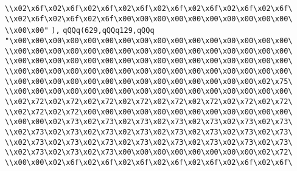 \verb|\\x02\x6f\x02\x6f\x02\x6f\x02\x6f\x02\x6f\x02\x6f\x02\x6f\x02\x6f\|\newline
\verb|\\x02\x6f\x02\x6f\x02\x6f\x00\x00\x00\x00\x00\x00\x00\x00\x00\x00\|\newline
\verb|\\x00\x00"|\newline
\verb|),|\newline
\verb|qQQq(629,qQQq129,qQQq|\newline
\verb|"\x00\x00\x00\x00\x00\x00\x00\x00\x00\x00\x00\x00\x00\x00\x00\x00\|\newline
\verb|\\x00\x00\x00\x00\x00\x00\x00\x00\x00\x00\x00\x00\x00\x00\x00\x00\|\newline
\verb|\\x00\x00\x00\x00\x00\x00\x00\x00\x00\x00\x00\x00\x00\x00\x00\x00\|\newline
\verb|\\x00\x00\x00\x00\x00\x00\x00\x00\x00\x00\x00\x00\x00\x00\x00\x00\|\newline
\verb|\\x00\x00\x00\x00\x00\x00\x00\x00\x00\x00\x00\x00\x00\x00\x02\x75\|\newline
\verb|\\x00\x00\x00\x00\x00\x00\x00\x00\x00\x00\x00\x00\x00\x00\x00\x00\|\newline
\verb|\\x02\x72\x02\x72\x02\x72\x02\x72\x02\x72\x02\x72\x02\x72\x02\x72\|\newline
\verb|\\x02\x72\x02\x72\x00\x00\x00\x00\x00\x00\x00\x00\x00\x00\x00\x00\|\newline
\verb|\\x00\x00\x02\x73\x02\x73\x02\x73\x02\x73\x02\x73\x02\x73\x02\x73\|\newline
\verb|\\x02\x73\x02\x73\x02\x73\x02\x73\x02\x73\x02\x73\x02\x73\x02\x73\|\newline
\verb|\\x02\x73\x02\x73\x02\x73\x02\x73\x02\x73\x02\x73\x02\x73\x02\x73\|\newline
\verb|\\x02\x73\x02\x73\x02\x73\x00\x00\x00\x00\x00\x00\x00\x00\x02\x72\|\newline
\verb|\\x00\x00\x02\x6f\x02\x6f\x02\x6f\x02\x6f\x02\x6f\x02\x6f\x02\x6f\|\newline

